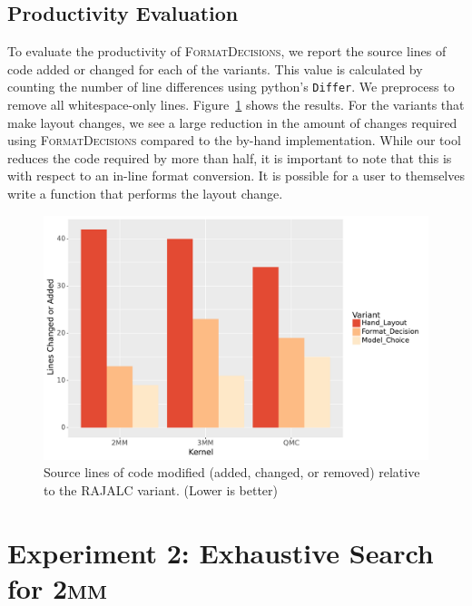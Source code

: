 \documentclass[sigconf,review=true]{acmart}
\newcommand{\FormatDecisions}[0]{{\textsc{FormatDecisions}}}
\begin{document}
\subsection{Productivity Evaluation}

To evaluate the productivity of \textsc{FormatDecisions}, we report the source lines of code added or changed for each of the variants.
This value is calculated by counting the number of line differences using python's \verb.Differ.. 
We preprocess to remove all whitespace-only lines.
Figure~\ref{PolybenchSLOC} shows the results.
For the variants that make layout changes, we see a large reduction in the amount of changes required using \FormatDecisions{} compared to the by-hand implementation. 
While our tool reduces the code required by more than half, it is important to note that this is with respect to an in-line format conversion.
It is possible for a user to themselves write a function that performs the layout change.

\begin{figure}
	\includegraphics[width=\columnwidth]{sloc.pdf}
	\caption{Source lines of code modified (added, changed, or removed) relative to the  RAJALC variant. (Lower is better)}
	\label{PolybenchSLOC}  
\end{figure}


\section{Experiment 2: Exhaustive Search for \textsc{2mm}}
\end{document}

